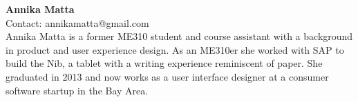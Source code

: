 \noindent \textbf{Annika Matta} \\
Contact: annikamatta@gmail.com \\
Annika Matta is a former ME310 student and course assistant with a background in product and user experience design. As an ME310er she worked with SAP to build the Nib, a tablet with a writing experience reminiscent of paper. She graduated in 2013 and now works as a user interface designer at a consumer software startup in the Bay Area.
